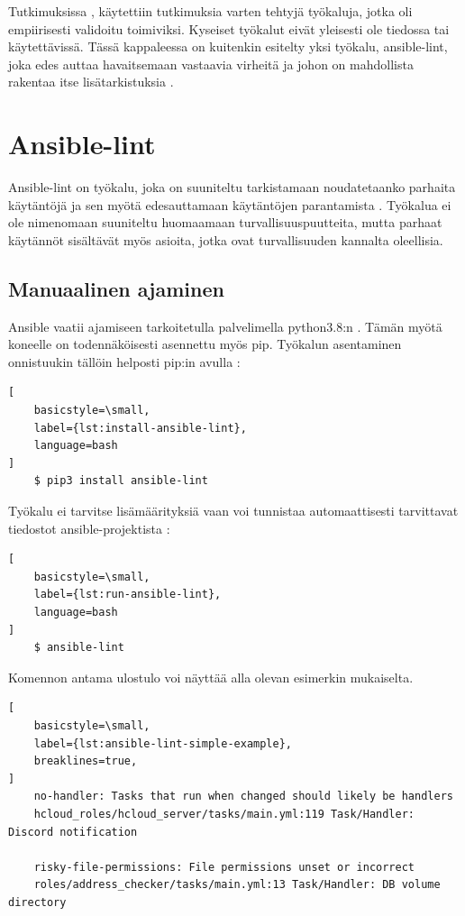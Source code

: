 Tutkimuksissa \parencite{RahmanAkond2019TSSS}, \parencite{RahmanAkond2021SSiA} käytettiin
tutkimuksia varten tehtyjä työkaluja, jotka oli empiirisesti validoitu toimiviksi.
Kyseiset työkalut eivät yleisesti ole tiedossa tai käytettävissä. Tässä kappaleessa on
kuitenkin esitelty yksi työkalu, ansible-lint, joka edes auttaa havaitsemaan vastaavia
virheitä ja johon on mahdollista rakentaa itse lisätarkistuksia \parencite{SestoVincent2020ATaV}.

\section{Ansible-lint}

Ansible-lint on työkalu, joka on suuniteltu tarkistamaan noudatetaanko parhaita
käytäntöjä ja sen myötä edesauttamaan käytäntöjen parantamista \parencite{GithubAnsibleLint}.
Työkalua ei ole nimenomaan suuniteltu huomaamaan turvallisuuspuutteita, mutta parhaat
käytännöt sisältävät myös asioita, jotka ovat turvallisuuden kannalta oleellisia.

\subsection{Manuaalinen ajaminen}

Ansible vaatii ajamiseen tarkoitetulla palvelimella python3.8:n \parencite{AnsibleDocs}.
Tämän myötä koneelle on todennäköisesti asennettu myös pip. Työkalun asentaminen
onnistuukin tällöin helposti pip:in avulla \parencite{AnsibleLintReadTheDocs}:

\begin{lstlisting}[
    basicstyle=\small,
    label={lst:install-ansible-lint},
    language=bash
]
    $ pip3 install ansible-lint
\end{lstlisting}

Työkalu ei tarvitse lisämäärityksiä vaan voi tunnistaa automaattisesti tarvittavat
tiedostot ansible-projektista \parencite{AnsibleLintReadTheDocs}:

\begin{lstlisting}[
    basicstyle=\small,
    label={lst:run-ansible-lint},
    language=bash
]
    $ ansible-lint
\end{lstlisting}

Komennon antama ulostulo voi näyttää alla olevan esimerkin mukaiselta.

\begin{lstlisting}[
    basicstyle=\small,
    label={lst:ansible-lint-simple-example},
    breaklines=true,
]
    no-handler: Tasks that run when changed should likely be handlers
    hcloud_roles/hcloud_server/tasks/main.yml:119 Task/Handler: Discord notification

    risky-file-permissions: File permissions unset or incorrect
    roles/address_checker/tasks/main.yml:13 Task/Handler: DB volume directory
\end{lstlisting}

